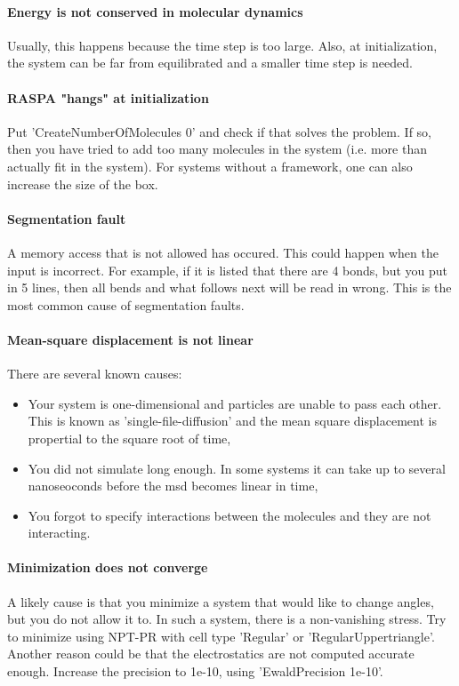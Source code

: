 \paragraph*{Energy is not conserved in molecular dynamics}
Usually, this happens because the time step is too large. Also, at initialization, the system can be far from equilibrated and a smaller time step is needed.

\paragraph*{RASPA "hangs" at initialization}
Put 'CreateNumberOfMolecules 0' and check if that solves the problem. If so, then you have tried to add too many molecules in the system (i.e. more than actually fit
in the system). For systems without a framework, one can also increase the size of the box.

\paragraph*{Segmentation fault} A memory access that is not allowed has occured. This could happen when the input is incorrect. For example, if it is listed that there
are 4 bonds, but you put in 5 lines, then all bends and what follows next will be read in wrong. This is the most common cause of segmentation faults.

\paragraph*{Mean-square displacement is not linear}
There are several known causes:
\begin{itemize}
\item{Your system is one-dimensional and particles are unable to pass each other. This is known as 'single-file-diffusion' and the mean
square displacement is propertial to the square root of time,}
\item{You did not simulate long enough. In some systems it can take up to several nanoseoconds before the msd becomes linear in time,}
\item{You forgot to specify interactions between the molecules and they are not interacting.}
\end{itemize}

\paragraph*{Minimization does not converge}
A likely cause is that you minimize a system that would like to change angles, but you do not allow it to. In such a system, there is a non-vanishing stress.
Try to minimize using NPT-PR with cell type 'Regular' or 'RegularUppertriangle'. Another reason could be that the electrostatics are not computed accurate enough.
Increase the precision to 1e-10, using 'EwaldPrecision 1e-10'.

